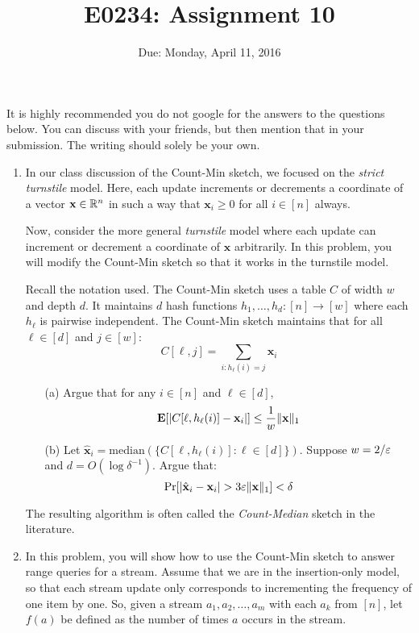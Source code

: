 \documentclass[11pt]{article}
\begin{document}
\def\Exp{\mathbf{Exp}}
\def\Var{\mathbf{Var}}
\title{E0234: Assignment 10}
\author{}
\date{Due: Monday, April 11, 2016}
\maketitle
It is highly recommended you do not google for the answers to the questions below. You can discuss with your friends, but then mention that in your submission.
The writing should solely be your own.

\begin{enumerate}
\item 
In our class discussion of the Count-Min sketch, we focused on the {\em strict turnstile} model. Here, each update increments or decrements a coordinate of a vector $\mathbf{x} \in \mathbb R^n$ in such a way that $\mathbf{x}_i \geq 0$ for all $i \in [n]$ always.

Now, consider the more general {\em turnstile} model where each update can increment or decrement a coordinate of $\mathbf{x}$ arbitrarily. In this problem, you will modify the Count-Min sketch so that it works in the turnstile model.

Recall the notation used. The Count-Min sketch uses a table $C$ of width $w$ and depth $d$. It maintains $d$ hash functions $h_1, \dots, h_d: [n] \to [w]$ where each $h_\ell$ is pairwise independent. The Count-Min sketch maintains that for all $\ell \in [d]$ and $j \in [w]$:
$$C[\ell, j] = \sum_{i: h_\ell(i)  = j} \mathbf{x}_i$$
\begin{enumerate}
\item[(a)]
Argue that for any $i \in [n]$ and $\ell \in [d]$, $$\hbox{\bf E}[|C[\ell, h_\ell(i)] - \mathbf{x}_i|] \leq \frac{1}{w} \|\mathbf{x}\|_1$$ 
\item[(b)]
Let $\hat{\mathbf{x}}_i = \text{median}(\{C[\ell, h_\ell(i)] : \ell \in [d]\})$. Suppose $w = 2/\varepsilon$ and $d = O(\log \delta^{-1})$. Argue that:
$$\Pr[|\hat{\mathbf{x}}_i - \mathbf{x}_i| > 3 \varepsilon \|\mathbf{x}\|_1] < \delta$$
\end{enumerate}
The resulting algorithm is often called the {\em Count-Median} sketch in the literature.

\item
In this problem, you will show how to use the Count-Min sketch to answer
range queries for a stream. Assume that we are in the insertion-only model, so that each stream update only corresponds to incrementing the frequency of one item by one. So, given a stream $a_1, a_2, \dots, a_m$ with
each $a_k$ from $[n]$, let $f(a)$ be defined as the number of times $a$ occurs in the stream. 


\end{enumerate}
\end{document}
